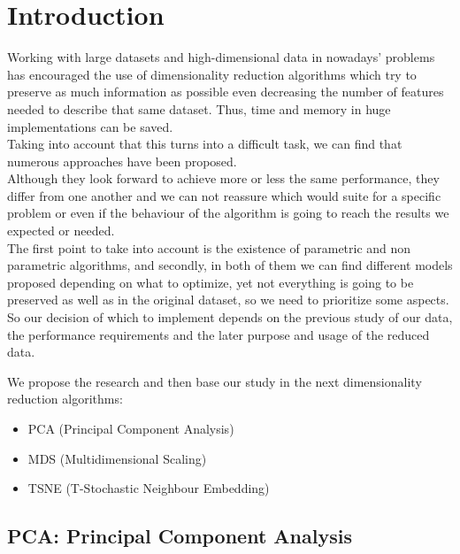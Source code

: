 \documentclass[a4paper,11pt,spanish]{report}
\begin{document}
\newpage
{}


\chapter{Introduction}
\label{chap:intro}

Working with large datasets and high-dimensional data in nowadays' problems has encouraged the use of dimensionality reduction algorithms which try to preserve as much information as possible even decreasing the number of features needed to describe that same dataset. Thus, time and memory in huge implementations can be saved. \\
Taking into account that this turns into a difficult task, we can find that numerous approaches have been proposed.\\
Although they look forward to achieve more or less the same performance, they differ from one another and we can not reassure which would suite for a specific problem or even if the behaviour of the algorithm is going to reach the results we expected or needed.\\
The first point to take into account is the existence of parametric and non parametric algorithms, and secondly, in both of them we can find different models proposed depending on what to optimize, yet not everything is going to be preserved as well as in the original dataset, so we need to prioritize some aspects.\\
So our decision of which to implement depends on the previous study of our data, the performance requirements and the later purpose and usage of the reduced data.

We propose the research and then base our study in the next dimensionality reduction algorithms:\\
\begin{itemize}
\item PCA (Principal Component Analysis)
\item MDS (Multidimensional Scaling)
\item TSNE (T-Stochastic Neighbour Embedding)
\end{itemize}

\section{PCA: Principal Component Analysis}
\label{PCA}
\end{document}
